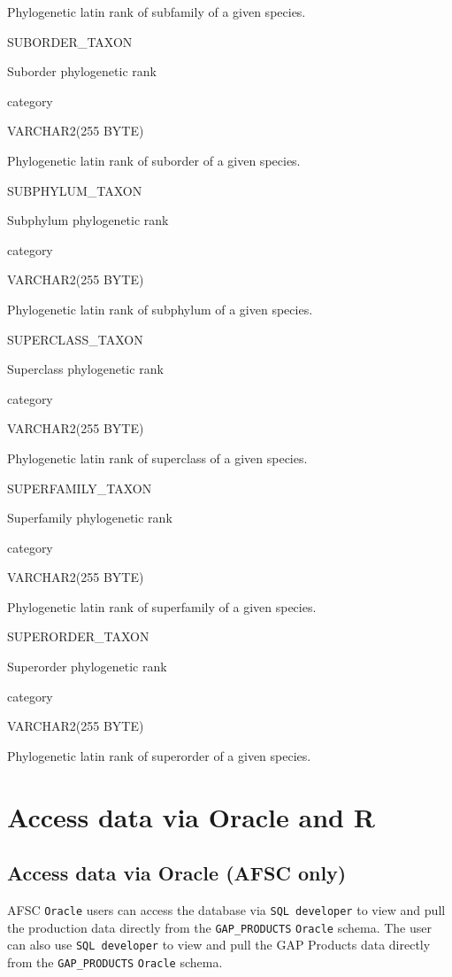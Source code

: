 \documentclass[
  letterpaper,
  oneside,
  open=any]{scrbook}
\begin{document}
Phylogenetic latin rank of subfamily of a given species.

SUBORDER\_TAXON

Suborder phylogenetic rank

category

VARCHAR2(255 BYTE)

Phylogenetic latin rank of suborder of a given species.

SUBPHYLUM\_TAXON

Subphylum phylogenetic rank

category

VARCHAR2(255 BYTE)

Phylogenetic latin rank of subphylum of a given species.

SUPERCLASS\_TAXON

Superclass phylogenetic rank

category

VARCHAR2(255 BYTE)

Phylogenetic latin rank of superclass of a given species.

SUPERFAMILY\_TAXON

Superfamily phylogenetic rank

category

VARCHAR2(255 BYTE)

Phylogenetic latin rank of superfamily of a given species.

SUPERORDER\_TAXON

Superorder phylogenetic rank

category

VARCHAR2(255 BYTE)

Phylogenetic latin rank of superorder of a given species.

\hypertarget{access-data-via-oracle-and-r}{%
\chapter{Access data via Oracle and
R}\label{access-data-via-oracle-and-r}}

\hypertarget{access-data-via-oracle-afsc-only}{%
\section*{Access data via Oracle (AFSC
only)}\label{access-data-via-oracle-afsc-only}}


AFSC \texttt{Oracle} users can access the database via
\texttt{SQL\ developer} to view and pull the production data directly
from the \texttt{GAP\_PRODUCTS} \texttt{Oracle} schema. The user can
also use \texttt{SQL\ developer} to view and pull the GAP Products data
directly from the \texttt{GAP\_PRODUCTS} \texttt{Oracle} schema.
\end{document}
